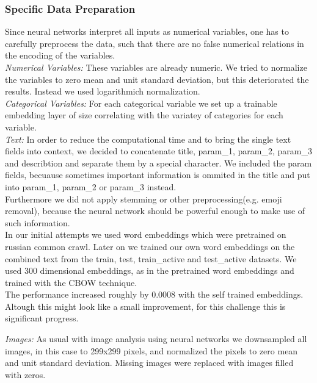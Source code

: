 \documentclass[runningheads]{llncs}
\begin{document}
 \subsubsection{Specific Data Preparation}
 Since neural networks interpret all inputs as numerical variables, one has to carefully preprocess the data, such that there are no false numerical relations in the encoding of the variables. \\
 
 \textit{Numerical Variables:} These variables are already numeric. We tried to normalize the variables to zero mean and unit standard deviation, but this deteriorated the results. Instead we used logarithmich normalization.\\ 
 
 \textit{Categorical Variables:} For each categorical variable we set up a trainable embedding layer of size correlating with the variatey of categories for each variable. \\
 
 \textit{Text:} In order to reduce the computational time and to bring the single text fields into context, we decided to concatenate title, param\_1, param\_2, param\_3 and  describtion and separate them by a special character. We included the param fields, becuause sometimes important information is ommited in the title and put into param\_1, param\_2 or param\_3 instead.\\
 Furthermore we did not apply stemming or other preprocessing(e.g. emoji removal), because the neural network should be powerful enough to make use of such information.\\
 In our initial attempts we used word embeddings which were pretrained on russian common crawl. Later on we trained our own word embeddings on the combined text from the train, test, train\_active and test\_active datasets. We used 300 dimensional embeddings, as in the pretrained word embeddings and trained with the CBOW technique.\\
 The performance increased roughly by 0.0008 with the self trained embeddings. Altough this might look like a small improvement, for this challenge this is significant progress.
 
 \textit{Images:} As usual with image analysis using neural networks we downsampled all images, in this case to 299x299 pixels, and normalized the pixels to zero mean and unit standard deviation. Missing images were replaced with images filled with zeros. \\
 
\end{document}

